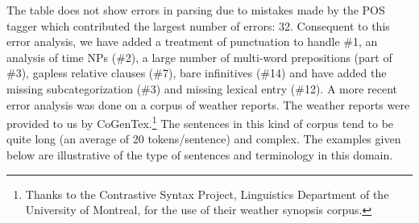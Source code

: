 The table does not show errors in parsing due to mistakes made by the POS
tagger which contributed the largest number of errors: 32. Consequent to
this error analysis, we have added a treatment of punctuation to handle
\#1, an analysis of time NPs (\#2), a large number of multi-word
prepositions (part of \#3), gapless relative clauses (\#7), bare
infinitives (\#14) and have added the missing subcategorization (\#3) and
missing lexical entry (\#12).  A more recent error analysis was done on a
corpus of weather reports. The weather reports were provided to us by
CoGenTex.\footnote{%
%
Thanks to the Contrastive Syntax Project, Linguistics Department of the
University of Montreal, for the use of their weather synopsis corpus.%
%
} The sentences in this kind of corpus tend to be quite long (an average of
20 tokens/sentence) and complex. The examples given below are illustrative
of the type of sentences and terminology in this domain.



